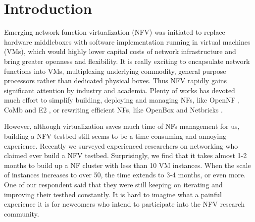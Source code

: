 \section{Introduction}
Emerging network function virtualization (NFV) was initiated to replace hardware middleboxes with software implementation running in virtual machines (VMs), which would highly lower capital costs of network infrastructure and bring greater openness and flexibility.
It is really exciting to encapsulate network functions into VMs, multiplexing underlying commodity, general purpose processors rather than dedicated physical boxes.
Thus NFV rapidly gains significant attention by industry and academia. Plenty of works has devoted much effort to simplify building, deploying and managing NFs, like OpenNF \cite{gember-jacobson_opennf:_2014}, CoMb \cite{180672} and E2 \cite{palkar_e2:_2015}, or rewriting efficient NFs, like OpenBox \cite{bremler-barr_openbox:_2016} and Netbricks \cite{199352}.



However, although virtualization saves much time of NFs management for us, building a NFV testbed still seems to be a time-consuming and annoying experience. Recently we surveyed experienced researchers on networking who claimed ever build a NFV testbed. Surprisingly, we find that it takes almost 1-2 months to build up a NF cluster with less than 10 VM instances. When the scale of instances increases to over 50, the time extends to 3-4 months, or even more. One of our respondent said that they were still keeping on iterating and improving their testbed constantly. It is hard to imagine what a painful experience it is for newcomers who intend to participate into the NFV research community.

